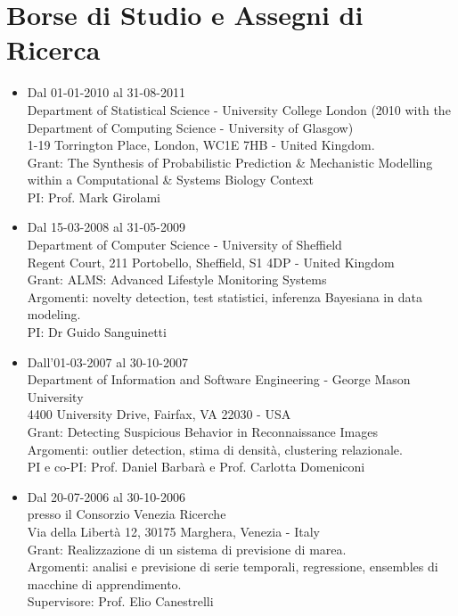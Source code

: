 \documentclass[a4paper,10pt]{article}
\begin{document}
\section*{Borse di Studio e Assegni di Ricerca}
\begin{itemize}
\item Dal 01-01-2010 al 31-08-2011 \\
  Department of Statistical Science - University College London (2010 with the Department of Computing Science - University of Glasgow) \\
  1-19 Torrington Place, London, WC1E 7HB - United Kingdom. \\
  Grant: The Synthesis of Probabilistic Prediction \& Mechanistic Modelling within a Computational \& Systems Biology Context \\
  PI: Prof. Mark Girolami

\item Dal 15-03-2008 al 31-05-2009 \\
  Department of Computer Science - University of Sheffield \\
  Regent Court, 211 Portobello, Sheffield, S1 4DP - United Kingdom \\
  Grant: ALMS: Advanced Lifestyle Monitoring Systems \\
  Argomenti: novelty detection, test statistici, inferenza Bayesiana in data modeling. \\
  PI: Dr Guido Sanguinetti

\item Dall'01-03-2007 al 30-10-2007 \\
  Department of Information and Software Engineering - George Mason University \\
  4400 University Drive, Fairfax, VA 22030 - USA \\
  Grant: Detecting Suspicious Behavior in Reconnaissance Images \\
  Argomenti: outlier detection, stima di densit\`a, clustering relazionale. \\
  PI e co-PI: Prof. Daniel Barbar\`a e Prof. Carlotta Domeniconi

\item Dal 20-07-2006 al 30-10-2006 \\
  presso il Consorzio Venezia Ricerche \\
  Via della Libert\`a 12, 30175 Marghera, Venezia - Italy \\
  Grant: Realizzazione di un sistema di previsione di marea. \\ 
  Argomenti: analisi e previsione di serie temporali, regressione, ensembles di macchine di apprendimento. \\
  Supervisore: Prof. Elio Canestrelli


\end{itemize}
\end{document}

